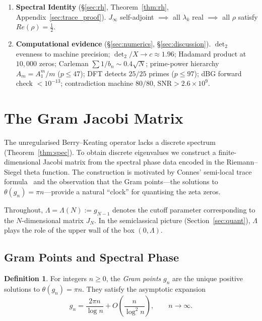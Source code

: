 \documentclass{pre-aomart}
\def\Re{Re}%
\def\xi{X}%
\theoremstyle{plain}
\theoremstyle{definition}
\newtheorem{definition}[theorem]{Definition}
\theoremstyle{remark}
\begin{document}
\begin{enumerate}[itemsep=2pt,leftmargin=*,labelsep=0.5em]
\item[\textbf{RH.}]
\textbf{Spectral Identity} (\S\ref{sec:rh}, Theorem~\ref{thm:rh}, Appendix~\ref{sec:trace_proof}).
$J_\infty$ self-adjoint $\implies$ all $\lambda_k$ real $\implies$
all $\rho$ satisfy $\Re(\rho)=\frac12$.

\item[\textbf{Verification.}]
\textbf{Computational evidence} (\S\ref{sec:numerics}, \S\ref{sec:discussion}).
$\det_2$ evenness to machine precision; $\det_2/\xi \to c \approx 1.96$;
Hadamard product at $10{,}000$ zeros; Carleman $\sum 1/b_n \sim 0.4\sqrt{N}$;
prime-power hierarchy $A_m = A_1^m/m$ ($p \le 47$);
DFT detects $25/25$ primes ($p \le 97$);
dBG forward check $< 10^{-13}$;
contradiction machine $80/80$, $\text{SNR} > 2.6 \times 10^9$.
\end{enumerate}

\section{The Gram Jacobi Matrix}
\label{sec:jacobi}

The unregularised Berry--Keating operator lacks a discrete spectrum
(Theorem~\ref{thm:spec}).  To obtain discrete eigenvalues we construct
a finite-dimensional Jacobi matrix from the spectral phase data encoded
in the Riemann--Siegel theta function.  The construction is motivated by
Connes' semi-local trace formula~\cite{Connes1999} and the observation
that the Gram points---the solutions to $\theta(g_n) = \pi n$---provide
a natural ``clock'' for quantising the zeta zeros.

Throughout, $\Lambda = \Lambda(N) := g_{N-1}$ denotes the cutoff
parameter corresponding to the $N$-dimensional matrix $J_N$.  In the
semiclassical picture (Section~\ref{sec:quant}), $\Lambda$ plays the
role of the upper wall of the box $(0,\Lambda)$.

\subsection{Gram Points and Spectral Phase}

\begin{definition}\label{def:gram}
For integers $n \ge 0$, the \emph{Gram points} $g_n$ are the unique
positive solutions to $\theta(g_n) = \pi n$.  They satisfy the asymptotic
expansion
\begin{equation}\label{eq:gram_asymp}
g_n = \frac{2\pi n}{\log n} + O\!\left(\frac{n}{\log^2 n}\right),
\qquad n \to \infty.
\end{equation}
\end{definition}
\end{document}
